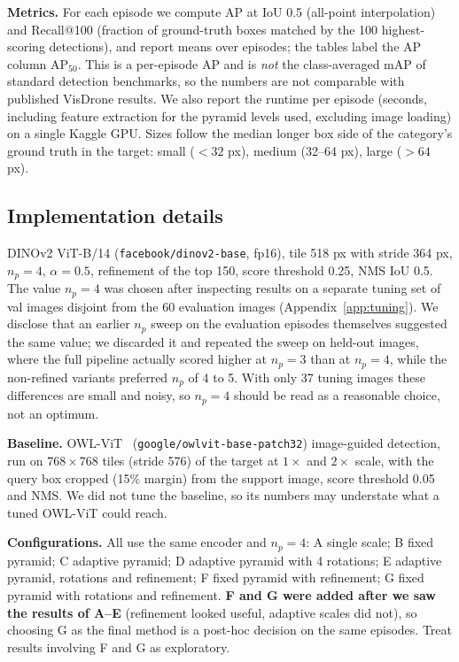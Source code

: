 \documentclass[10pt,twocolumn,letterpaper]{article}
\newcommand{\ap}{AP$_{50}$}
\begin{document}
\noindent\textbf{Metrics.} For each episode we compute AP at IoU 0.5 (all-point interpolation) and Recall@100 (fraction of ground-truth boxes matched by the 100 highest-scoring detections), and report means over episodes; the tables label the AP column \ap{}. This is a per-episode AP and is \emph{not} the class-averaged mAP of standard detection benchmarks, so the numbers are not comparable with published VisDrone results. We also report the runtime per episode (seconds, including feature extraction for the pyramid levels used, excluding image loading) on a single Kaggle GPU. Sizes follow the median longer box side of the category's ground truth in the target: small ($<32$ px), medium (32--64 px), large ($>64$ px).

\subsection{Implementation details}
DINOv2 ViT-B/14 (\texttt{facebook/dinov2-base}, fp16), tile 518 px with stride 364 px, $n_p=4$, $\alpha=0.5$, refinement of the top 150, score threshold 0.25, NMS IoU 0.5. The value $n_p=4$ was chosen after inspecting results on a separate tuning set of val images disjoint from the 60 evaluation images (Appendix~\ref{app:tuning}). We disclose that an earlier $n_p$ sweep on the evaluation episodes themselves suggested the same value; we discarded it and repeated the sweep on held-out images, where the full pipeline actually scored higher at $n_p=3$ than at $n_p=4$, while the non-refined variants preferred $n_p$ of 4 to 5. With only 37 tuning images these differences are small and noisy, so $n_p=4$ should be read as a reasonable choice, not an optimum.

\noindent\textbf{Baseline.} OWL-ViT~\cite{minderer2022owlvit} (\texttt{google/owlvit-base-patch32}) image-guided detection, run on $768\times768$ tiles (stride 576) of the target at $1\times$ and $2\times$ scale, with the query box cropped (15\% margin) from the support image, score threshold 0.05 and NMS. We did not tune the baseline, so its numbers may understate what a tuned OWL-ViT could reach.

\noindent\textbf{Configurations.} All use the same encoder and $n_p=4$:
A single scale; B fixed pyramid; C adaptive pyramid; D adaptive pyramid with 4 rotations; E adaptive pyramid, rotations and refinement; F fixed pyramid with refinement; G fixed pyramid with rotations and refinement. \textbf{F and G were added after we saw the results of A--E} (refinement looked useful, adaptive scales did not), so choosing G as the final method is a post-hoc decision on the same episodes. Treat results involving F and G as exploratory.
\end{document}
